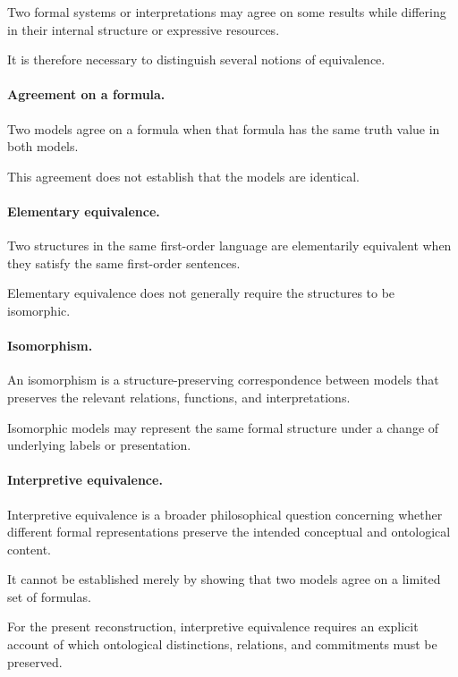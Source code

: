 Two formal systems or interpretations may agree
on some results while differing in their internal
structure or expressive resources.

It is therefore necessary to distinguish several
notions of equivalence.

\paragraph{Agreement on a formula.}

Two models agree on a formula when that formula
has the same truth value in both models.

This agreement does not establish that the models
are identical.

\paragraph{Elementary equivalence.}

Two structures in the same first-order language
are elementarily equivalent when they satisfy
the same first-order sentences.

Elementary equivalence does not generally require
the structures to be isomorphic.

\paragraph{Isomorphism.}

An isomorphism is a structure-preserving correspondence
between models that preserves the relevant relations,
functions, and interpretations.

Isomorphic models may represent the same formal
structure under a change of underlying labels or
presentation.

\paragraph{Interpretive equivalence.}

Interpretive equivalence is a broader philosophical
question concerning whether different formal
representations preserve the intended conceptual
and ontological content.

It cannot be established merely by showing that
two models agree on a limited set of formulas.

For the present reconstruction, interpretive
equivalence requires an explicit account of which
ontological distinctions, relations, and commitments
must be preserved.

